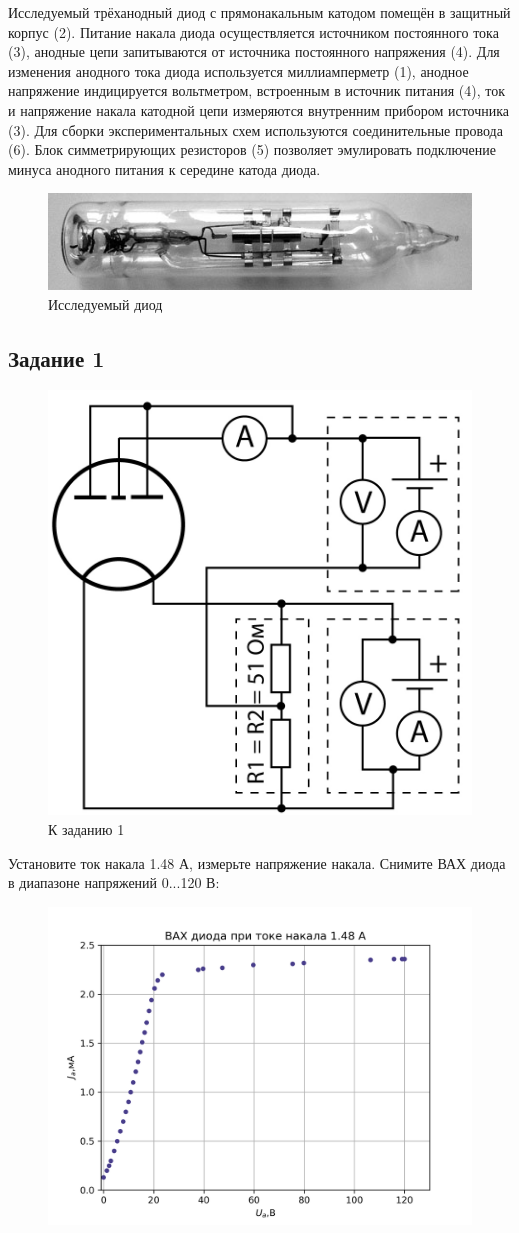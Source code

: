Исследуемый трёханодный диод с прямонакальным катодом помещён в защитный корпус (2). Питание накала диода осуществляется источником постоянного тока (3), анодные цепи запитываются от источника постоянного напряжения (4). Для изменения анодного тока диода используется миллиамперметр (1), анодное напряжение индицируется вольтметром, встроенным в источник питания (4), ток и напряжение накала катодной цепи измеряются внутренним прибором источника (3). Для сборки экспериментальных схем используются соединительные провода (6). Блок симметрирующих резисторов (5) позволяет эмулировать подключение минуса анодного питания к середине катода диода.

\begin{figure}[h!]
	\centering
	\includegraphics[width=0.5\linewidth]{fig/img10.jpg}
	\caption{Исследуемый диод}
	\label{fig:11}
\end{figure}

\subsection{Задание 1}
\begin{figure}[h!]
	\centering
	\includegraphics[width=0.4\linewidth]{fig/z1.jpg}
	\caption{К заданию 1}
	\label{fig:12}
\end{figure}


Установите ток накала 1.48 А, измерьте напряжение накала. Снимите ВАХ диода в диапазоне напряжений 0...120 В:

\begin{figure}[H]
	\centering
	\includegraphics[width=0.9\linewidth]{scripts/z1.png}
	\caption{}
	\label{fig:13}
\end{figure}
\newpage
